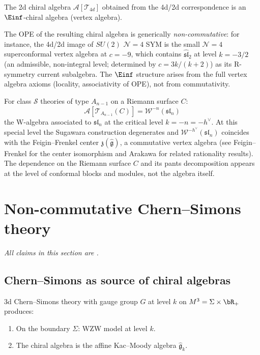\begin{theorem}%
The 2d chiral algebra $\mathcal{A}[\mathcal{T}_{4d}]$ obtained from the 4d/2d
correspondence is an $\Einf$-chiral algebra (vertex algebra).

The OPE of the resulting chiral algebra is generically \emph{non-commutative}: for instance, the 4d/2d image of $SU(2)$ $\mathcal{N}=4$ SYM is the small $\mathcal{N}=4$ superconformal vertex algebra at $c = -9$, which contains $\widehat{\mathfrak{sl}}_2$ at level $k = -3/2$ (an admissible, non-integral level; determined by $c = 3k/(k+2)$) as its R-symmetry current subalgebra.  The $\Einf$ structure arises from the full vertex algebra axioms (locality, associativity of OPE), not from commutativity.
\end{theorem}

\begin{example}%
For class $\mathcal{S}$ theories of type $A_{n-1}$ on a Riemann surface $C$:
\[
\mathcal{A}[\mathcal{T}_{A_{n-1}}(C)] = \mathcal{W}^{-n}(\mathfrak{sl}_n)
\]
the W-algebra associated to $\mathfrak{sl}_n$ at the critical level $k = -n = -h^\vee$. At this special level the Sugawara construction degenerates and $\mathcal{W}^{-h^\vee}(\mathfrak{sl}_n)$ coincides with the Feigin--Frenkel center $\mathfrak{z}(\widehat{\mathfrak{g}})$, a commutative vertex algebra (see Feigin--Frenkel \cite{FF} for the center isomorphism and Arakawa \cite{Ara15} for related rationality results). The dependence on the Riemann surface $C$ and its pants decomposition appears at the level of conformal blocks and modules, not the algebra itself.
\end{example}


\section{Non-commutative Chern--Simons theory}
\noindent\emph{All claims in this section are \ClaimStatusConjectured.}

\subsection{Chern--Simons as source of chiral algebras}

\begin{construction}%
3d Chern--Simons theory with gauge group $G$ at level $k$ on $M^3 = \Sigma \times \bR_+$ 
produces:
\begin{enumerate}[label=(\roman*)]
\item On the boundary $\Sigma$: WZW model at level $k$.
\item The chiral algebra is the affine Kac--Moody algebra $\hat{\mathfrak{g}}_k$.
\end{enumerate}
\end{construction}

